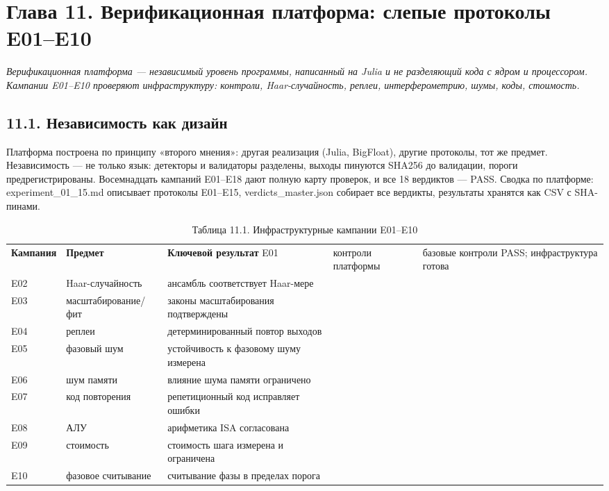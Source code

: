 \documentclass[11pt,a4paper]{article}
\begin{document}
\section{Глава 11. Верификационная платформа: слепые протоколы E01–E10}

\noindent\textit{\color{copper}Верификационная платформа — независимый уровень программы, написанный на Julia и не разделяющий кода с ядром и процессором. Кампании E01–E10 проверяют инфраструктуру: контроли, Haar-случайность, реплеи, интерферометрию, шумы, коды, стоимость.}

\subsection{11.1. Независимость как дизайн}

Платформа построена по принципу «второго мнения»: другая реализация (Julia, BigFloat), другие протоколы, тот же предмет. Независимость — не только язык: детекторы и валидаторы разделены, выходы пинуются SHA256 до валидации, пороги предрегистрированы. Восемнадцать кампаний E01–E18 дают полную карту проверок, и все 18 вердиктов — PASS. Сводка по платформе: experiment\_01\_15.md описывает протоколы E01–E15, verdicts\_master.json собирает все вердикты, результаты хранятся как CSV с SHA-пинами.

\begin{table}[htbp]\centering\small
\caption{Таблица 11.1. Инфраструктурные кампании E01–E10}
\begin{tabular}{p{} p{} p{}}
\toprule
\textbf{Кампания} & \textbf{Предмет} & \textbf{Ключевой результат}
\midrule
E01 & контроли платформы & базовые контроли PASS; инфраструктура готова \\
E02 & Haar-случайность & ансамбль соответствует Haar-мере \\
E03 & масштабирование/фит & законы масштабирования подтверждены \\
E04 & реплеи & детерминированный повтор выходов \\
E05 & фазовый шум & устойчивость к фазовому шуму измерена \\
E06 & шум памяти & влияние шума памяти ограничено \\
E07 & код повторения & репетиционный код исправляет ошибки \\
E08 & АЛУ & арифметика ISA согласована \\
E09 & стоимость & стоимость шага измерена и ограничена \\
E10 & фазовое считывание & считывание фазы в пределах порога \\
\bottomrule
\end{tabular}
\end{table}
\end{document}
